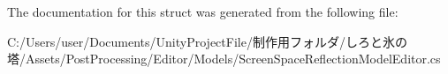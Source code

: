 The documentation for this struct was generated from the following file\+:\begin{DoxyCompactItemize}
\item 
C\+:/\+Users/user/\+Documents/\+Unity\+Project\+File/制作用フォルダ/しろと氷の塔/\+Assets/\+Post\+Processing/\+Editor/\+Models/Screen\+Space\+Reflection\+Model\+Editor.\+cs\end{DoxyCompactItemize}
